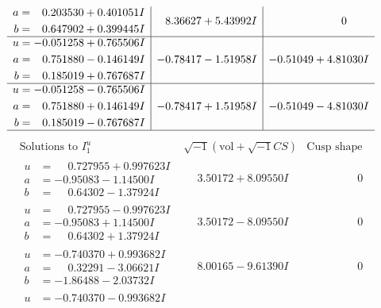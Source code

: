 \documentclass[1p]{elsarticle_modified}
\theoremstyle{definition}
\newcommand{\I}{\sqrt{-1}}
\begin{document}
$$\begin{array}{c|c|c}
\begin{aligned}
a &= \phantom{-}0.203530 + 0.401051 I \\
b &= \phantom{-}0.647902 + 0.399445 I\end{aligned}
 & \phantom{-}8.36627 + 5.43992 I & \phantom{-0.000000 } 0 \\ \hline\begin{aligned}
u &= -0.051258 + 0.765506 I \\
a &= \phantom{-}0.751880 - 0.146149 I \\
b &= \phantom{-}0.185019 + 0.767687 I\end{aligned}
 & -0.78417 - 1.51958 I & -0.51049 + 4.81030 I \\ \hline\begin{aligned}
u &= -0.051258 - 0.765506 I \\
a &= \phantom{-}0.751880 + 0.146149 I \\
b &= \phantom{-}0.185019 - 0.767687 I\end{aligned}
 & -0.78417 + 1.51958 I & -0.51049 - 4.81030 I\\
 \hline 
 \end{array}$$\newpage$$\begin{array}{c|c|c}  
\text{Solutions to }I^u_{1}& \I (\text{vol} + \sqrt{-1}CS) & \text{Cusp shape}\\
 \hline 
\begin{aligned}
u &= \phantom{-}0.727955 + 0.997623 I \\
a &= -0.95083 - 1.14500 I \\
b &= \phantom{-}0.64302 - 1.37924 I\end{aligned}
 & \phantom{-}3.50172 + 8.09550 I & \phantom{-0.000000 } 0 \\ \hline\begin{aligned}
u &= \phantom{-}0.727955 - 0.997623 I \\
a &= -0.95083 + 1.14500 I \\
b &= \phantom{-}0.64302 + 1.37924 I\end{aligned}
 & \phantom{-}3.50172 - 8.09550 I & \phantom{-0.000000 } 0 \\ \hline\begin{aligned}
u &= -0.740370 + 0.993682 I \\
a &= \phantom{-}0.32291 - 3.06621 I \\
b &= -1.86488 - 2.03732 I\end{aligned}
 & \phantom{-}8.00165 - 9.61390 I & \phantom{-0.000000 } 0 \\ \hline\begin{aligned}
u &= -0.740370 - 0.993682 I \\

\end{aligned}
\end{array}$$
\end{document}
